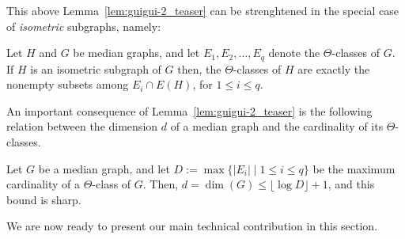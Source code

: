 \documentclass[a4paper,UKenglish,numberwithinsect,cleveref, autoref]{lipics-v2021}
\begin{document}
This above Lemma~\ref{lem:guigui-2_teaser} can be strenghtened in the special case of {\em isometric} subgraphs, namely:

\begin{lemma}[\ref{lem:guigui-2bis}]\label{lem:guigui-2bis_teaser}
Let $H$ and $G$ be median graphs, and let $E_1,E_2,\ldots,E_q$ denote the $\Theta$-classes of $G$.
If $H$ is an isometric subgraph of $G$ then, the $\Theta$-classes of $H$ are exactly the nonempty subsets among $E_i \cap E(H)$, for $1 \leq i \leq q$.
\end{lemma}

An important consequence of Lemma~\ref{lem:guigui-2_teaser} is the following relation between the dimension $d$ of a median graph and the cardinality of its $\Theta$-classes.

\begin{lemma}[\ref{lem:guigui-3}]\label{lem:guigui-3_teaser}
Let $G$ be a median graph, and let $D := \max\{ |E_i| \mid 1 \leq i \leq q\}$ be the maximum cardinality of a $\Theta$-class of $G$. Then, $d = \dim(G) \leq \lfloor\log{D}\rfloor + 1$, and this bound is sharp.
\end{lemma}

We are now ready to present our main technical contribution in this section.
\end{document}
